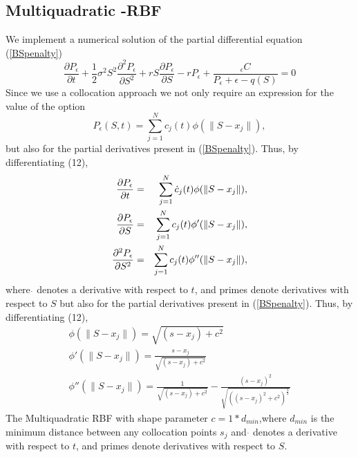 \documentclass[12pt]{article}
\numberwithin{equation}{section} %
\begin{document}
\subsection{Multiquadratic -RBF}


We implement a numerical solution of the partial differential
equation (\ref{BSpenalty})
$$
\frac{\partial P_\epsilon}{\partial
t}+\frac{1}{2}\sigma^2S^2\frac{\partial^2 P_\epsilon}{\partial S^2}
+rS\frac{\partial P_\epsilon}{\partial
S}-rP_\epsilon+\frac{_\epsilon C }{P_\epsilon + \epsilon - q(S)}=0
$$
Since we use a collocation approach we not only require an
expression for the value of the option
\begin{equation}\label{RBFExpansion}
P_\epsilon (S,t) = \sum_{j=1}^N c_j(t) \phi(\|S-x_j\|),
\end{equation}
but also for the partial derivatives present in (\ref{BSpenalty}).
Thus, by differentiating (12),
\begin{eqnarray*}
\frac{\partial P_\epsilon}{\partial t} & = & \sum_{j=1}^N
\dot{c}_j(t) \phi(\|S-x_j\|), \cr \frac{\partial
P_\epsilon}{\partial S} & = & \sum_{j=1}^N c_j(t) \phi'(\|S-x_j\|),
\cr \frac{\partial^{2} P_\epsilon}{\partial S^{2}} & = &
\sum_{j=1}^N c_j(t) \phi''(\|S-x_j\|),
\end{eqnarray*}
where $\dot{}$ denotes a derivative with respect to $t$, and primes
denote derivatives with respect to $S$ but also for the partial
derivatives present in (\ref{BSpenalty}). Thus, by differentiating
(12),
\begin{eqnarray*}
\phi(\|S-x_j\|)= \sqrt{(s-x_j)+c^2}\\
\phi'(\|S-x_j\|)=\frac{s-x_j}{\sqrt{(s-x_j)+c^2}}\\
\phi''(\|S-x_j\|)=\frac{1}{\sqrt{(s-x_j)+c^2}}-\frac{(s-x_j)^2}{\sqrt{((s-x_j)^2+c^2)^\frac{3}{2}}}
\end{eqnarray*}
The Multiquadratic RBF with shape parameter $c=1*d_{min}$,where
$d_{min}$ is the minimum distance between any collocation points
$s_j$ and $\dot{}$ denotes a derivative with respect to $t$, and
primes denote derivatives with respect to $S$.
\end{document}
